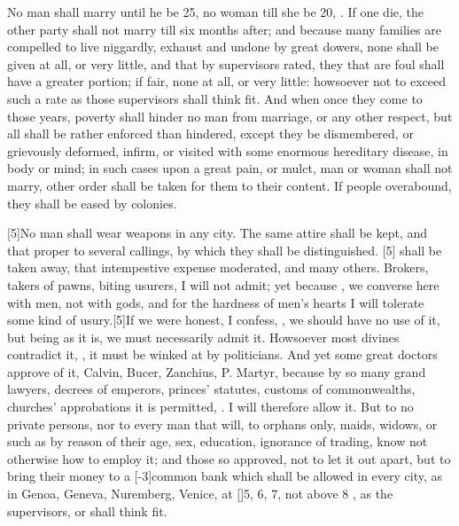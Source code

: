 No man shall marry until he be 25, no woman till she be 20, 
. If one die, the other party shall
not marry till six months after; and because many families are
compelled to live niggardly, exhaust and undone by great dowers,
none shall be given at all, or very little, and that by
supervisors rated, they that are foul shall have a greater portion; if
fair, none at all, or very little: howsoever not to exceed such a
rate as those supervisors shall think fit. And when once they come to
those years, poverty shall hinder no man from marriage, or any other
respect, but all shall be rather enforced than hindered,
except they be dismembered, or grievously deformed, infirm,
or visited with some enormous hereditary disease, in body or mind; in
such cases upon a great pain, or mulct, man or woman shall not
marry, other order shall be taken for them to their content. If people
overabound, they shall be eased by colonies.

[5\baselineskip]No man shall wear weapons in any city. The same attire shall be
kept, and that proper to several callings, by which they shall be
distinguished. [5\baselineskip] shall be taken away, that
intempestive expense moderated, and many others. Brokers, takers of
pawns, biting usurers, I will not admit; yet because , we converse here with men, not with gods, and for
the hardness of men's hearts I will tolerate some kind of usury.[5\baselineskip]If
we were honest, I confess, , we should have no use of
it, but being as it is, we must necessarily admit it. Howsoever most
divines contradict it, ,
it must be winked at by politicians. And yet some great doctors approve
of it, Calvin, Bucer, Zanchius, P. Martyr, because by so many grand
lawyers, decrees of emperors, princes' statutes, customs of
commonwealths, churches' approbations it is permitted, \etc{}. I will
therefore allow it. But to no private persons, nor to every man that
will, to orphans only, maids, widows, or such as by reason of their
age, sex, education, ignorance of trading, know not otherwise how to
employ it; and those so approved, not to let it out apart, but to bring
their money to a [-3\baselineskip]common bank which shall be allowed in every city,
as in Genoa, Geneva, Nuremberg, Venice, at [\baselineskip]5, 6, 7, not above 8
, as the supervisors, or  shall think fit.

